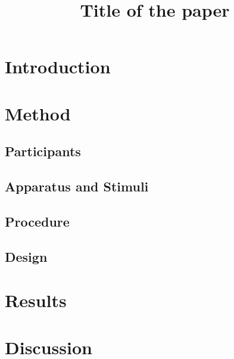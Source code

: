 \documentclass[man, hidelinks, floatsintext, 12pt, a4paper]{apa7}\usepackage[]{graphicx}\usepackage[]{xcolor}
\title{Title of the paper}
\begin{document}
\maketitle
\justifying
\setlength\parindent{12mm}

\section{Introduction}
\label{sec:introduction}


\section{Method}
\label{sec:method}


\subsection{Participants}
\label{sub:participants}


\subsection{Apparatus and Stimuli}
\label{sub:apparatus_and_stimuli}


\subsection{Procedure}
\label{sub:procedure}


\subsection{Design}
\label{sub:design}


\section{Results}
\label{sec:results}


\section{Discussion}
\label{sec:discussion}


\printbibliography

\appendix
\section{}%
\label{abs}

\end{document}
